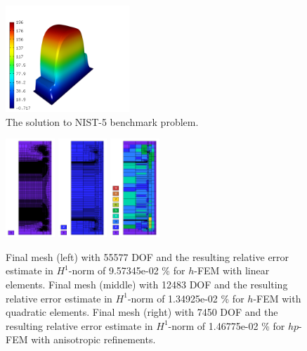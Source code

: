 \documentclass[12pt]{elsarticle}
\begin{document}
\begin{figure}[H]
\centering
\vspace{-5mm}
\includegraphics[height=4cm]{nist/nist-5/solution.png}
\vspace{-5mm}
\caption{The solution to NIST-5 benchmark problem.}
\label{fig:sln-nist05}
\end{figure}

\begin{figure}[H]
\centering
\vspace{-5mm}
\includegraphics[height=3.7cm]{nist/nist-5/mesh_h1_aniso.png}
\includegraphics[height=3.7cm]{nist/nist-5/mesh_h2_aniso.png}
\includegraphics[height=3.7cm]{nist/nist-5/mesh_hp_aniso.png}
\vspace{-5mm}
\caption{
Final mesh (left) with 55577 DOF and the resulting
relative error estimate in $H^1$-norm of 9.57345e-02 \% for $h$-FEM with linear elements.
Final mesh (middle) with 12483 DOF and the resulting
relative error estimate in $H^1$-norm of 1.34925e-02 \% for $h$-FEM with quadratic elements.
Final mesh (right) with 7450 DOF and the resulting
relative error estimate in $H^1$-norm of 1.46775e-02 \% for $hp$-FEM with anisotropic refinements.}
\vspace{-5mm}
\label{fig:nist-5-hp-aniso}
\end{figure}
\end{document}
